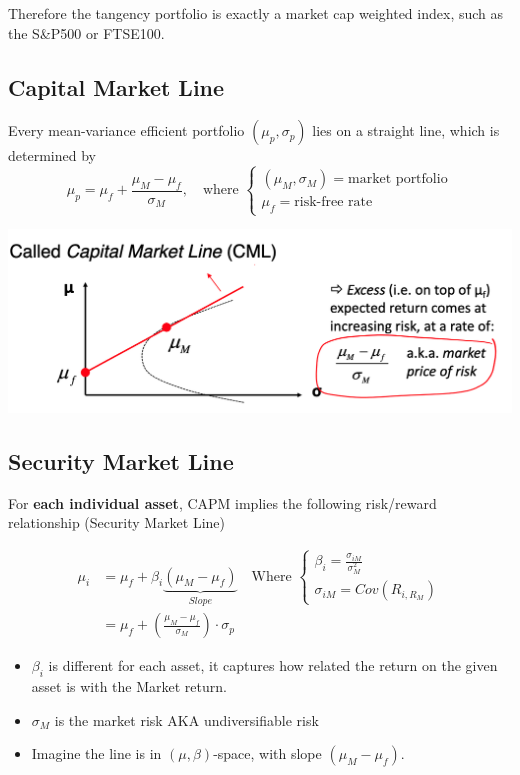 \documentclass[
  oneside]{book}
\providecommand{\tightlist}{%
  \setlength{\itemsep}{0pt}\setlength{\parskip}{0pt}}
\begin{document}
Therefore the tangency portfolio is exactly a market cap weighted index, such as the S\&P500 or FTSE100.

\hypertarget{capital-market-line}{%
\subsection{Capital Market Line}\label{capital-market-line}}

Every mean-variance efficient portfolio \((\mu_{p},\sigma_{p})\) lies on a straight line, which is determined by
\[
\mu_{p} = \mu_{f} + \frac{\mu_{M}-\mu_{f}}{\sigma_{M}}, \quad \text{where }\begin{cases}
(\mu_{M},\sigma_{M}) = \text{market portfolio} \\
\mu_{f} = \text{risk-free rate}
\end{cases}
\]

\includegraphics{Notes/Obsidian-Attachments/5-Portfolio-Theory-3.png}

\hypertarget{security-market-line}{%
\subsection{Security Market Line}\label{security-market-line}}

For \textbf{each individual asset}, CAPM implies the following risk/reward relationship (Security Market Line)

\[
\begin{aligned}
\mu_{i} &= \mu_{f} + \beta_{i}\underbrace{ (\mu_{M}-\mu_{f}) }_{ Slope }
\quad \text{Where } \begin{cases}
\beta_{i} = \frac{\sigma_{iM}}{\sigma^{2}_{M}} \\
\sigma_{iM} = Cov(R_{i, R_{M}})
\end{cases}\\
&= \mu_{f} + \left( \frac{\mu_{M}-\mu_{f}}{\sigma_{M}} \right) \cdot \sigma_{p}
\end{aligned}
\]

\begin{itemize}
\tightlist
\item
  \(\beta_{i}\) is different for each asset, it captures how related the return on the given asset is with the Market return.
\item
  \(\sigma_{M}\) is the market risk AKA undiversifiable risk
\item
  Imagine the line is in \((\mu,\beta)\)-space, with slope \((\mu_{M}-\mu_{f})\).
\end{itemize}
\end{document}
